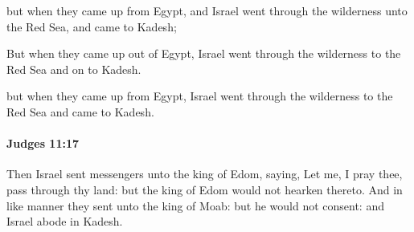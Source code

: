			\begin{versebox}
					\item[BHS] 
					\item[ASV] but when they came up from Egypt, and Israel went through the wilderness unto the Red Sea, and came to Kadesh;
					\item[NIV] But when they came up out of Egypt, Israel went through the wilderness to the Red Sea and on to Kadesh.
					\item[NRSV] but when they came up from Egypt, Israel went through the wilderness to the Red Sea and came to Kadesh.
			\end{versebox}

		\paragraph{Judges 11:17} %
			\label{JUDGES-11-17}

			Then Israel sent messengers unto the king of Edom, saying, Let me, I pray thee, pass through thy land: but the king of Edom would not hearken thereto. And in like manner they sent unto the king of Moab: but he would not consent: and Israel abode in Kadesh.

